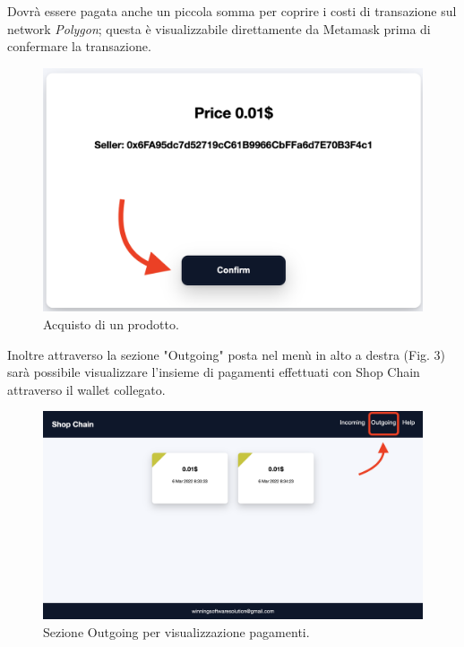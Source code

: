 \documentclass[a4paper, 12pt]{article}
\begin{document}
Dovrà essere pagata anche un piccola somma per coprire i costi di transazione sul network \textit{Polygon}; questa è visualizzabile direttamente da Metamask prima di confermare la transazione.
\FloatBarrier
\begin{figure}[!h]
\centering
\includegraphics[width=0.5\linewidth]{img/oggetto_in_vendita.png}
\caption{Acquisto di un prodotto.}
\end{figure}
\FloatBarrier
Inoltre attraverso la sezione "Outgoing" posta nel menù in alto a destra (Fig. 3) sarà possibile visualizzare l'insieme di pagamenti effettuati con Shop Chain attraverso il wallet collegato.
\FloatBarrier
\begin{figure}[!h]
\centering
\includegraphics[width=0.8\linewidth]{img/visualizzazione_ordini.png}
\caption{Sezione Outgoing per visualizzazione pagamenti.}
\end{figure}
\FloatBarrier
\end{document}

